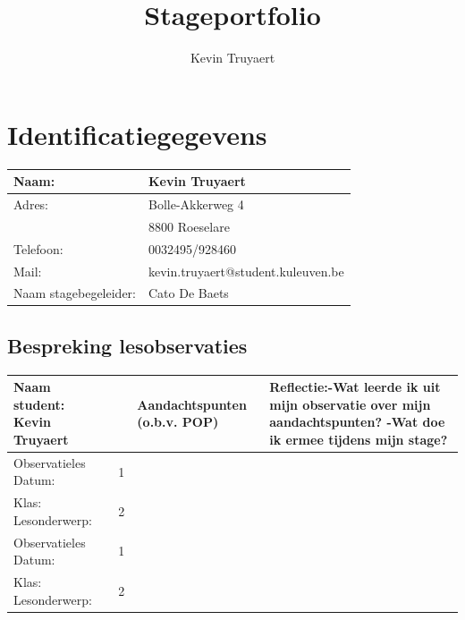 \documentclass[a4paper,12pt,twoside]{article}%
\title{Stageportfolio}
\author{Kevin Truyaert}
\date{}
\begin{document}
\maketitle


\section*{Identificatiegegevens}
\begin{center}
	\begin{tabular}{ll}
	\hline
	Naam: & Kevin Truyaert\\ \hline
	Adres: & Bolle-Akkerweg 4\\
		& 8800 Roeselare\\\hline
	Telefoon: & 0032495/928460\\\hline
	Mail: & kevin.truyaert@student.kuleuven.be\\\hline
	Naam stagebegeleider: & Cato De Baets\\ \hline
\end{tabular}
\end{center}

\newpage
\tableofcontents
\newpage









\begin{landscape}
	
\section{Bespreking lesobservaties}

\begin{tabularx}{1.56\textwidth}{|C{0.25\textwidth}|C{0.1\textwidth}|C{0.25\textwidth}|X|}\hline
	\textbf{Naam student: Kevin Truyaert} & & Aandachtspunten (o.b.v. POP) & Reflectie:\newline -Wat leerde ik uit mijn observatie over mijn aandachtspunten? \newline -Wat doe ik ermee tijdens mijn stage?\\\hline
	Observatieles \newline Datum: & 1 & & \\
	Klas: \newline Lesonderwerp: & 2 & & \\\hline
	Observatieles \newline Datum: & 1 & & \\
	Klas: \newline Lesonderwerp: & 2 & & \\\hline
	
\end{tabularx}
\end{landscape}
\end{document}
